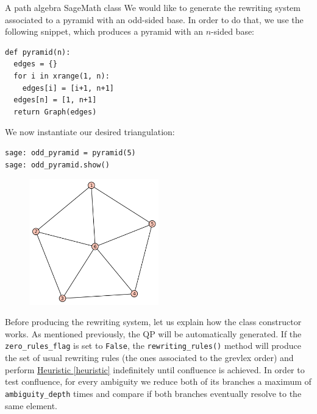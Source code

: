 \begin{chapter}{A path algebra SageMath class}
We would like to generate the rewriting system associated to a pyramid with an odd-sided base. In order to do that, we use the following snippet, which produces a pyramid with an $n$-sided base:
\begin{lstlisting}
def pyramid(n):
  edges = {}
  for i in xrange(1, n):
    edges[i] = [i+1, n+1]
  edges[n] = [1, n+1]
  return Graph(edges)
\end{lstlisting}
We now instantiate our desired triangulation:
\begin{lstlisting}
sage: odd_pyramid = pyramid(5)
sage: odd_pyramid.show()
\end{lstlisting}
\begin{figure}[h]
\centering
\includegraphics[width=0.5\textwidth]{odd_pyramid.png}
\end{figure}
Before producing the rewriting system, let us explain how the class constructor works. As mentioned previously, the QP will be automatically generated. If the \texttt{zero\_rules\_flag} is set to \texttt{False}, the \texttt{rewriting\_rules()} method will produce the set of usual rewriting rules (the ones associated to the grevlex order) and perform \hyperref[heuristic]{Heuristic \ref*{heuristic}} indefinitely until confluence is achieved. In order to test confluence, for every ambiguity we reduce both of its branches a maximum of \texttt{ambiguity\_depth} times and compare if both branches eventually resolve to the same element.


\end{chapter}
